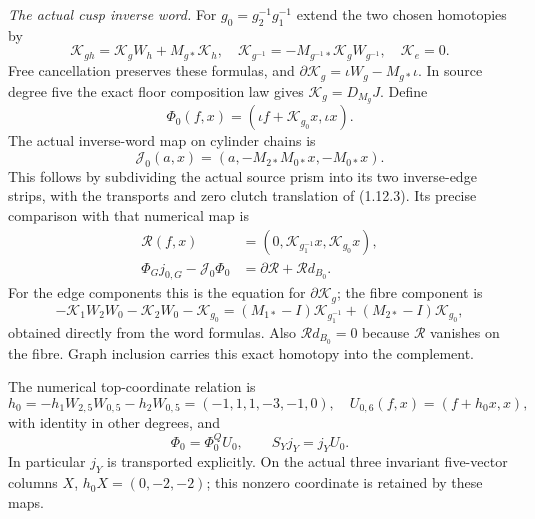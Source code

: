 \item \emph{The actual cusp inverse word.}
For $g_0=g_2^{-1}g_1^{-1}$ extend the two chosen homotopies by
\[
 \mathcal K_{gh}=\mathcal K_gW_h+M_{g*}\mathcal K_h,\quad
 \mathcal K_{g^{-1}}=-M_{g^{-1}*}\mathcal K_gW_{g^{-1}},\quad
 \mathcal K_e=0.
\]
Free cancellation preserves these formulas, and
$\partial\mathcal K_g=\iota W_g-M_{g*}\iota$.
In source degree five the exact floor composition law gives
$\mathcal K_g=D_{M_g}J$. Define
\[
 \Phi_0(f,x)=(\iota f+\mathcal K_{g_0}x,\iota x).
\]
The actual inverse-word map on cylinder chains is
\[
 \mathcal J_0(a,x)=(a,-M_{2*}M_{0*}x,-M_{0*}x).
\]
This follows by subdividing the actual source prism into its two
inverse-edge strips, with the transports and zero clutch translation
of (1.12.3). Its precise comparison with that numerical map is
\[
\begin{split}
 \mathcal R(f,x)&=(0,\mathcal K_{g_1^{-1}}x,\mathcal K_{g_0}x),\\
 \Phi_Gj_{0,G}-\mathcal J_0\Phi_0
      &=\partial\mathcal R+\mathcal R d_{B_0}.
\end{split}
\]
For the edge components this is the equation for
$\partial\mathcal K_g$; the fibre component is
\[
 -\mathcal K_1W_2W_0-\mathcal K_2W_0-\mathcal K_{g_0}
 =(M_{1*}-I)\mathcal K_{g_1^{-1}}
                      +(M_{2*}-I)\mathcal K_{g_0},
\]
obtained directly from the word formulas. Also
$\mathcal R d_{B_0}=0$ because $\mathcal R$ vanishes on the fibre.
Graph inclusion carries this exact homotopy into the complement.

The numerical top-coordinate relation is
\[
 h_0=-h_1W_{2,5}W_{0,5}-h_2W_{0,5}=(-1,1,1,-3,-1,0),
 \quad U_{0,6}(f,x)=(f+h_0x,x),
\]
with identity in other degrees, and
\[
 \Phi_0=\Phi_0^QU_0,\qquad S_Yj_Y=j_YU_0.
\]
In particular $j_Y$ is transported explicitly. On the actual three
invariant five-vector columns $X$, $h_0X=(0,-2,-2)$; this nonzero
coordinate is retained by these maps.


